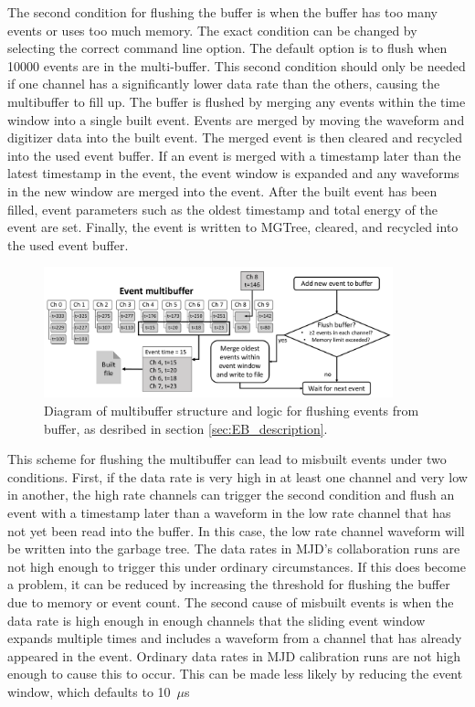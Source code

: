 \documentclass[/main.tex]{subfiles}
\begin{document}
The second condition for flushing the buffer is when the buffer has too many events or uses too much memory.
The exact condition can be changed by selecting the correct command line option.
The default option is to flush when 10000 events are in the multi-buffer.
This second condition should only be needed if one channel has a significantly lower data rate than the others, causing the multibuffer to fill up.
The buffer is flushed by merging any events within the time window into a single built event.
Events are merged by moving the waveform and digitizer data into the built event.
The merged event is then cleared and recycled into the used event buffer.
If an event is merged with a timestamp later than the latest timestamp in the event, the event window is expanded and any waveforms in the new window are merged into the event.
After the built event has been filled, event parameters such as the oldest timestamp and total energy of the event are set.
Finally, the event is written to MGTree, cleared, and recycled into the used event buffer.
\par

\begin{figure}
  \centering
  \includegraphics[width=0.9\textwidth]{MultibufferDiagram}
  \caption[Event builder multibuffer diagram]{\label{fig:MB_diagram}
    Diagram of multibuffer structure and logic for flushing events from buffer, as desribed in section \ref{sec:EB_description}.}
\end{figure}

This scheme for flushing the multibuffer can lead to misbuilt events under two conditions.
First, if the data rate is very high in at least one channel and very low in another, the high rate channels can trigger the second condition and flush an event with a timestamp later than a waveform in the low rate channel that has not yet been read into the buffer.
In this case, the low rate channel waveform will be written into the garbage tree.
The data rates in MJD's collaboration runs are not high enough to trigger this under ordinary circumstances.
If this does become a problem, it can be reduced by increasing the threshold for flushing the buffer due to memory or event count.
The second cause of misbuilt events is when the data rate is high enough in enough channels that the sliding event window expands multiple times and includes a waveform from a channel that has already appeared in the event.
Ordinary data rates in MJD calibration runs are not high enough to cause this to occur.
This can be made less likely by reducing the event window, which defaults to 10~$\mu$s
\end{document}
